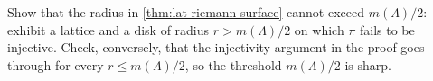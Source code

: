 \begin{exercise}
\label{ex:lat-chart-radius}
Show that the radius in \cref{thm:lat-riemann-surface} cannot exceed
\(m(\Lambda)/2\): exhibit a lattice and a disk of radius \(r > m(\Lambda)/2\) on
which \(\pi\) fails to be injective. Check, conversely, that the injectivity
argument in the proof goes through for every \(r \le m(\Lambda)/2\), so the
threshold \(m(\Lambda)/2\) is sharp.
\end{exercise}

